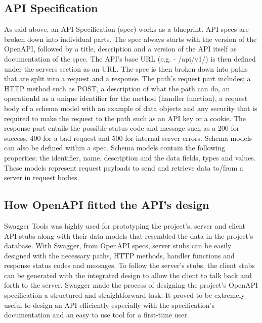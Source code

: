 \subsection{API Specification}
As said above, an API Specification (spec) works as a blueprint. API specs are broken down into individual parts. The spec always starts with the version of the OpenAPI, followed by a title, description and a version of the API itself as documentation of the spec. The API's base URL (e.g. - /api/v1/) is then defined under the servers section as an URL. The spec is then broken down into paths that are split into a request and a response. The path's request part includes; a HTTP method such as POST, a description of what the path can do, an operationId as a unique identifier for the method (handler function), a request body of a schema model with an example of data objects and any security that is required to make the request to the path such as an API key or a cookie. The response part entails the possible status code and message such as a 200 for success, 400 for a bad request and 500 for internal server errors. Schema models can also be defined within a spec. Schema models contain the following properties; the identifier, name, description and the data fields, types and values. These models represent request payloads to send and retrieve data to/from a server in request bodies. \cite{ref6}

\subsection{How OpenAPI fitted the API's design}
Swagger Tools was highly used for prototyping the project's, server and client API stubs along with their data models that resembled the data in the project's database. With Swagger, from OpenAPI specs, server stubs can be easily designed with the necessary paths, HTTP methods, handler functions and response status codes and messages. To follow the server's stubs, the client stubs can be generated with the integrated design to allow the client to talk back and forth to the server. Swagger made the process of designing the project's OpenAPI specification a structured and straightforward task. It proved to be extremely useful to design an API efficiently especially with the specification's documentation and an easy to use tool for a first-time user.

